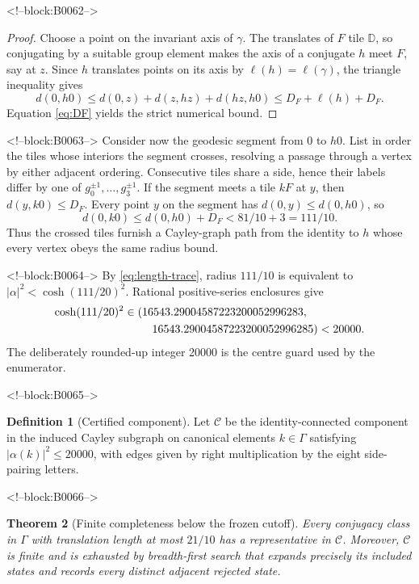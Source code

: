 \documentclass[11pt,a4paper]{article}
\newtheorem{theorem}{Theorem}[section]
\theoremstyle{definition}
\newtheorem{definition}[theorem]{Definition}
\newcommand{\D}{\mathbb D}
\newcommand{\length}{\ell}
\begin{document}
<!--block:B0062-->
\begin{proof}
Choose a point on the invariant axis of \(\gamma\).  The translates of \(F\)
tile \(\D\), so conjugating by a suitable group element makes the axis of a
conjugate \(h\) meet \(F\), say at \(z\).  Since \(h\) translates points on its
axis by \(\length(h)=\length(\gamma)\), the triangle inequality gives
\[
 d(0,h0)\leq d(0,z)+d(z,hz)+d(hz,h0)
 \leq D_F+\length(h)+D_F.
\]
Equation \eqref{eq:DF} yields the strict numerical bound.
\end{proof}

<!--block:B0063-->
Consider now the geodesic segment from \(0\) to \(h0\).  List in order the
tiles whose interiors the segment crosses, resolving a passage through a
vertex by either adjacent ordering.  Consecutive tiles share a side, hence
their labels differ by one of
\(g_0^{\pm1},\ldots,g_3^{\pm1}\).  If the segment meets a tile \(kF\) at
\(y\), then \(d(y,k0)\leq D_F\).  Every point \(y\) on the segment has
\(d(0,y)\leq d(0,h0)\), so
\begin{equation}\label{eq:chain-radius}
 d(0,k0)\leq d(0,h0)+D_F<81/10+3=111/10.
\end{equation}
Thus the crossed tiles furnish a Cayley-graph path from the identity to \(h\)
whose every vertex obeys the same radius bound.

<!--block:B0064-->
By \eqref{eq:length-trace}, radius \(111/10\) is equivalent to
\(|\alpha|^2<\cosh(111/20)^2\).  Rational positive-series enclosures give
\begin{equation}\label{eq:guard}
\begin{aligned}
 \cosh(111/20)^2
 &\in(16543.29004587223200052996283,\\
 &\hspace{2.5em}16543.29004587223200052996285)<20000.
\end{aligned}
\end{equation}
The deliberately rounded-up integer 20000 is the centre guard used by the
enumerator.

<!--block:B0065-->
\begin{definition}[Certified component]
Let \(\mathcal C\) be the identity-connected component in the induced Cayley
subgraph on canonical elements \(k\in\Gamma\) satisfying
\(|\alpha(k)|^2\leq20000\), with edges given by right multiplication by the
eight side-pairing letters.
\end{definition}

<!--block:B0066-->
\begin{theorem}[Finite completeness below the frozen cutoff]
\label{thm:complete}
Every conjugacy class in \(\Gamma\) with translation length at most \(21/10\)
has a representative in \(\mathcal C\).  Moreover, \(\mathcal C\) is finite
and is exhausted by breadth-first search that expands precisely its included
states and records every distinct adjacent rejected state.
\end{theorem}
\end{document}
